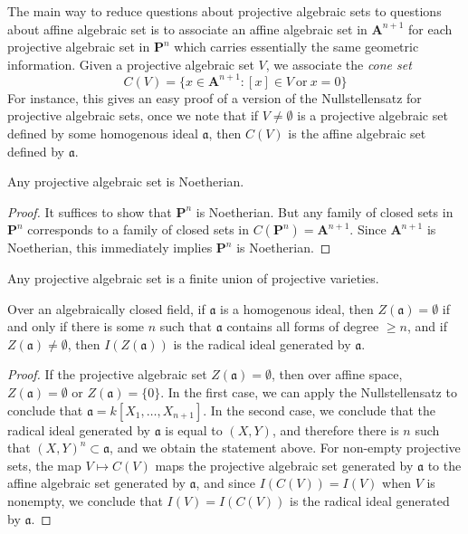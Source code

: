 The main way to reduce questions about projective algebraic sets to questions about affine algebraic set is to associate an affine algebraic set in $\mathbf{A}^{n+1}$ for each projective algebraic set in $\mathbf{P}^n$ which carries essentially the same geometric information. Given a projective algebraic set $V$, we associate the \emph{cone set}
%
\[ C(V) = \{ x \in \mathbf{A}^{n+1}: [x] \in V\ \text{or}\ x = 0 \} \]
%
For instance, this gives an easy proof of a version of the Nullstellensatz for projective algebraic sets, once we note that if $V \neq \emptyset$ is a projective algebraic set defined by some homogenous ideal $\mathfrak{a}$, then $C(V)$ is the affine algebraic set defined by $\mathfrak{a}$.

\begin{theorem}
    Any projective algebraic set is Noetherian.
\end{theorem}
\begin{proof}
    It suffices to show that $\mathbf{P}^n$ is Noetherian. But any family of closed sets in $\mathbf{P}^n$ corresponds to a family of closed sets in $C(\mathbf{P}^n) = \mathbf{A}^{n+1}$. Since $\mathbf{A}^{n+1}$ is Noetherian, this immediately implies $\mathbf{P}^n$ is Noetherian.
\end{proof}

\begin{corollary}
    Any projective algebraic set is a finite union of projective varieties.
\end{corollary}

\begin{theorem}
    Over an algebraically closed field, if $\mathfrak{a}$ is a homogenous ideal, then $Z(\mathfrak{a}) = \emptyset$ if and only if there is some $n$ such that $\mathfrak{a}$ contains all forms of degree $\geq n$, and if $Z(\mathfrak{a}) \neq \emptyset$, then $I(Z(\mathfrak{a}))$ is the radical ideal generated by $\mathfrak{a}$.
\end{theorem}
\begin{proof}
    If the projective algebraic set $Z(\mathfrak{a}) = \emptyset$, then over affine space, $Z(\mathfrak{a}) = \emptyset$ or $Z(\mathfrak{a}) = \{ 0 \}$. In the first case, we can apply the Nullstellensatz to conclude that $\mathfrak{a} = k[X_1, \dots, X_{n+1}]$. In the second case, we conclude that the radical ideal generated by $\mathfrak{a}$ is equal to $(X,Y)$, and therefore there is $n$ such that $(X,Y)^n \subset \mathfrak{a}$, and we obtain the statement above. For non-empty projective sets, the map $V \mapsto C(V)$ maps the projective algebraic set generated by $\mathfrak{a}$ to the affine algebraic set generated by $\mathfrak{a}$, and since $I(C(V)) = I(V)$ when $V$ is nonempty, we conclude that $I(V) = I(C(V))$ is the radical ideal generated by $\mathfrak{a}$.
\end{proof}

